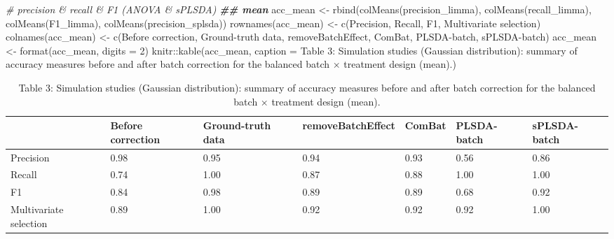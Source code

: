 \documentclass[
]{book}
\newenvironment{Shaded}{\begin{snugshade}}{\end{snugshade}}
\newcommand{\AttributeTok}[1]{\textcolor[rgb]{0.77,0.63,0.00}{#1}}
\newcommand{\CommentTok}[1]{\textcolor[rgb]{0.56,0.35,0.01}{\textit{#1}}}
\newcommand{\DecValTok}[1]{\textcolor[rgb]{0.00,0.00,0.81}{#1}}
\newcommand{\DocumentationTok}[1]{\textcolor[rgb]{0.56,0.35,0.01}{\textbf{\textit{#1}}}}
\newcommand{\FunctionTok}[1]{\textcolor[rgb]{0.00,0.00,0.00}{#1}}
\newcommand{\NormalTok}[1]{#1}
\newcommand{\OtherTok}[1]{\textcolor[rgb]{0.56,0.35,0.01}{#1}}
\newcommand{\SpecialCharTok}[1]{\textcolor[rgb]{0.00,0.00,0.00}{#1}}
\newcommand{\StringTok}[1]{\textcolor[rgb]{0.31,0.60,0.02}{#1}}
\begin{document}
\begin{Shaded}
\begin{Highlighting}[]
\CommentTok{\# precision \& recall \& F1 (ANOVA \& sPLSDA)}
\DocumentationTok{\#\# mean}
\NormalTok{acc\_mean }\OtherTok{\textless{}{-}} \FunctionTok{rbind}\NormalTok{(}\FunctionTok{colMeans}\NormalTok{(precision\_limma), }\FunctionTok{colMeans}\NormalTok{(recall\_limma), }
                  \FunctionTok{colMeans}\NormalTok{(F1\_limma), }\FunctionTok{colMeans}\NormalTok{(precision\_splsda))}
\FunctionTok{rownames}\NormalTok{(acc\_mean) }\OtherTok{\textless{}{-}} \FunctionTok{c}\NormalTok{(}\StringTok{\textquotesingle{}Precision\textquotesingle{}}\NormalTok{, }\StringTok{\textquotesingle{}Recall\textquotesingle{}}\NormalTok{, }\StringTok{\textquotesingle{}F1\textquotesingle{}}\NormalTok{, }\StringTok{\textquotesingle{}Multivariate selection\textquotesingle{}}\NormalTok{)}
\FunctionTok{colnames}\NormalTok{(acc\_mean) }\OtherTok{\textless{}{-}} \FunctionTok{c}\NormalTok{(}\StringTok{\textquotesingle{}Before correction\textquotesingle{}}\NormalTok{, }\StringTok{\textquotesingle{}Ground{-}truth data\textquotesingle{}}\NormalTok{, }
                        \StringTok{\textquotesingle{}removeBatchEffect\textquotesingle{}}\NormalTok{, }\StringTok{\textquotesingle{}ComBat\textquotesingle{}}\NormalTok{, }
                        \StringTok{\textquotesingle{}PLSDA{-}batch\textquotesingle{}}\NormalTok{, }\StringTok{\textquotesingle{}sPLSDA{-}batch\textquotesingle{}}\NormalTok{)}
\NormalTok{acc\_mean }\OtherTok{\textless{}{-}} \FunctionTok{format}\NormalTok{(acc\_mean, }\AttributeTok{digits =} \DecValTok{2}\NormalTok{)}
\NormalTok{knitr}\SpecialCharTok{::}\FunctionTok{kable}\NormalTok{(acc\_mean, }\AttributeTok{caption =} \StringTok{\textquotesingle{}Table 3: Simulation studies (Gaussian distribution): summary of accuracy measures before and after batch correction for the balanced batch × treatment design (mean).\textquotesingle{}}\NormalTok{)}
\end{Highlighting}
\end{Shaded}

\begin{table}

\caption{\label{tab:unnamed-chunk-101}Table 3: Simulation studies (Gaussian distribution): summary of accuracy measures before and after batch correction for the balanced batch × treatment design (mean).}
\centering
\begin{tabular}[t]{l|l|l|l|l|l|l}
\hline
  & Before correction & Ground-truth data & removeBatchEffect & ComBat & PLSDA-batch & sPLSDA-batch\\
\hline
Precision & 0.98 & 0.95 & 0.94 & 0.93 & 0.56 & 0.86\\
\hline
Recall & 0.74 & 1.00 & 0.87 & 0.88 & 1.00 & 1.00\\
\hline
F1 & 0.84 & 0.98 & 0.89 & 0.89 & 0.68 & 0.92\\
\hline
Multivariate selection & 0.89 & 1.00 & 0.92 & 0.92 & 0.92 & 1.00\\
\hline
\end{tabular}
\end{table}
\end{document}
